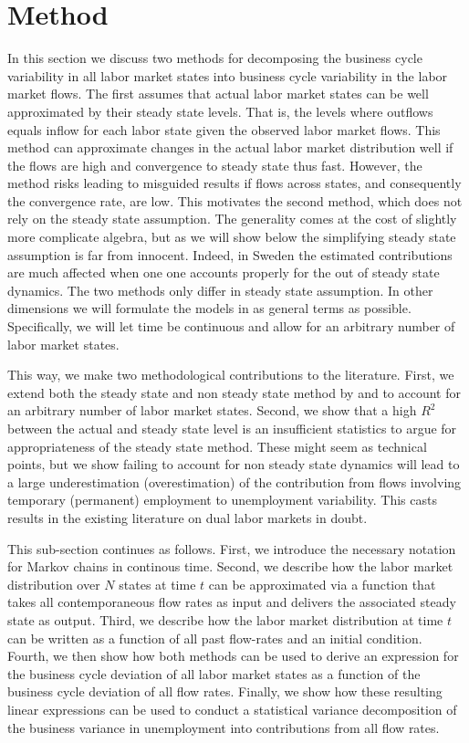 \section{Method}
\label{sec:method}

In this section we discuss two methods for decomposing the business cycle variability in all labor market states into business cycle variability in the labor market flows. The first assumes that actual labor market states can be well approximated by their steady state levels. That is, the levels where outflows equals inflow for each labor state given the observed labor market flows. This method can approximate changes in the actual labor market distribution well if the flows are high and convergence to steady state thus fast. However, the method risks leading to misguided results if flows across states, and consequently the convergence rate, are low. This motivates the second method, which does not rely on the steady state assumption. The generality comes at the cost of slightly more complicate algebra, but as we will show below the simplifying steady state assumption is far from innocent. Indeed, in Sweden the estimated contributions are much affected when one one accounts properly for the out of steady state dynamics. The two methods only differ in steady state assumption. In other dimensions we will formulate the models in as general terms as possible. Specifically, we will let time be continuous and allow for an arbitrary number of labor market states.

This way, we make two methodological contributions to the literature. First, we extend both the steady state and non steady state method by \cite{Shimer2012} and \cite{Elsby2013} to account for an arbitrary number of labor market states. Second, we show that a high $R^2$ between the actual and steady state level is an insufficient statistics to argue for appropriateness of the steady state method. These might seem as technical points, but we show failing to account for non steady state dynamics will lead to a large underestimation (overestimation) of the contribution from flows involving temporary (permanent) employment to unemployment variability. This casts results in the existing literature on dual labor markets \cite{Silva2013, Hairault2015} in doubt.

This sub-section continues as follows. First, we introduce the necessary notation for Markov chains in continous time. Second, we describe how the labor market distribution over $N$ states at time $t$ can be approximated via a function that takes all contemporaneous flow rates as input and delivers the associated steady state as output. Third, we describe how the labor market distribution at time $t$ can be written as a function of all past flow-rates and an initial condition. Fourth, we then show how both methods can be used to derive an expression for the business cycle deviation of all labor market states as a function of the business cycle deviation of all flow rates. Finally, we show how these resulting linear expressions can be used to conduct a statistical variance decomposition of the business variance in unemployment into contributions from all flow rates.

